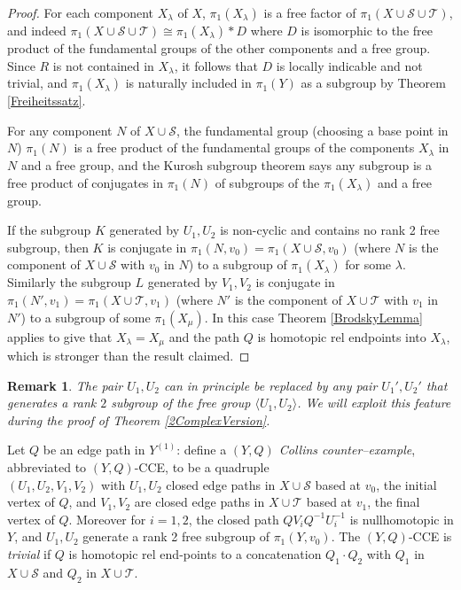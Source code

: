 \documentclass[12pt,a4paper]{amsart}
\def\<{\langle}
\def\>{\rangle}
\def\cS{\mathcal{S}}
\def\cT{\mathcal{T}}
\newtheorem{rmk}[thm]{Remark}
\begin{document}
\begin{proof}  
For each component  
 $X_\lambda$ of $X$,  
 $\pi_1(X_\lambda)$ is a free factor of $\pi_1(X\cup\cS\cup\cT)$, and
indeed  
$\pi_1(X\cup\cS\cup\cT) \cong \pi_1(X_\lambda) * D$ where $D$ is isomorphic to the free product of the
fundamental groups of the other components and a free group.
Since $R$ is not contained in  
 $X_\lambda$,
it follows that $D$ is locally indicable and not trivial,
and   
 $\pi_1(X_\lambda)$ is naturally included in  $\pi_1(Y)$ as a subgroup
by  Theorem \ref{Freiheitssatz}.


For any  component $N$ of $X\cup\cS$,  the fundamental group  (choosing a  base  point in $N$)
$\pi_1(N)$ is a free product of the fundamental groups of the components 
$X_\lambda$ in $N$ and  a free group,
and the Kurosh subgroup theorem says any subgroup 
is  a free product of conjugates in $\pi_1(N)$ of subgroups of the  
$\pi_1(X_\lambda)$ and a free group. 

If the subgroup $K$ generated by $U_1,U_2$ is  non-cyclic and contains no 
rank 2 free subgroup, then $K$ is conjugate in  $\pi_1(N,v_0)=\pi_1(X\cup\cS,v_0)$ 
(where $N$ is the component of $X\cup\cS$ with $v_0$ in $N$) 
to a  subgroup of $\pi_1(X_\lambda)$ for some $\lambda$. 
Similarly the subgroup $L$ generated by $V_1,V_2$ is conjugate  in   $\pi_1(N',v_1)=\pi_1(X\cup\cT,v_1)$ 
(where $N'$ is the component of 
$X\cup\cT$ with  $v_1$ in $N'$) 
to a subgroup of  some $\pi_1(X_\mu)$.
In this case   Theorem \ref{BrodskyLemma} applies 
to give that  $X_\lambda=X_\mu$ and the path $Q$ 
is homotopic rel endpoints into   
$X_\lambda$, which is stronger than the result claimed.
\end{proof}
 
\begin{rmk}\label{passtosubgroup}
The pair $U_1,U_2$ can in principle be replaced by any pair $U_1',U_2'$ that generates a rank $2$ subgroup of the free group $\<U_1,U_2\>$.  We will exploit this feature during the proof of Theorem \ref{2ComplexVersion}.
\end{rmk}


 \smallskip
{} 
Let $Q$ be an edge path in $Y^{(1)}$: 
define a {\it $(Y,Q)$ Collins counter--example\/}, abbreviated to $(Y,Q)$-CCE,
to be  a quadruple\\ $(U_1, U_2,V_1,V_2)$ with $U_1, U_2$ closed edge paths in $X\cup\cS$ based at $v_0$, 
the initial vertex of $Q$, and
$V_1,V_2$ are closed edge paths in $X\cup\cT$ based at $v_1$, the final vertex of $Q$.
Moreover   for $i=1,2$, the closed path $QV_iQ^{-1}U_i^{-1}$ is nullhomotopic in $Y$, 
and $U_1,U_2$   generate a rank 2 free subgroup of 
$\pi_1(Y,v_0)$. 
The $(Y,Q)$-CCE is {\it trivial\/} if $Q$ is   homotopic rel end-points to a concatenation $Q_1\cdot Q_2$
with $Q_1$ in $X\cup\cS$ and $Q_2$ in $X\cup\cT$.
\end{document}
